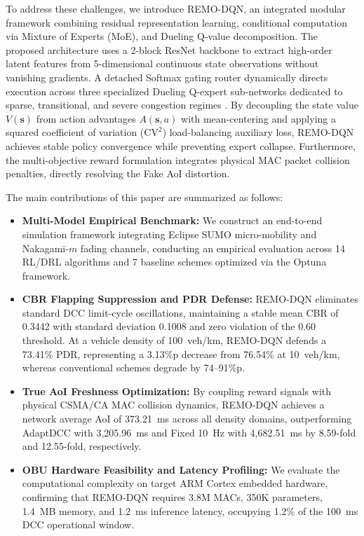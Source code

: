 \documentclass[journal]{IEEEtran}
\begin{document}
To address these challenges, we introduce REMO-DQN, an integrated modular framework combining residual representation learning, conditional computation via Mixture of Experts (MoE), and Dueling Q-value decomposition. The proposed architecture uses a 2-block ResNet backbone to extract high-order latent features from 5-dimensional continuous state observations without vanishing gradients. A detached Softmax gating router dynamically directs execution across three specialized Dueling Q-expert sub-networks dedicated to sparse, transitional, and severe congestion regimes \cite{Shazeer2017Outrageously, Xu2025Mixture}. By decoupling the state value $V(\mathbf{s})$ from action advantages $A(\mathbf{s}, a)$ with mean-centering and applying a squared coefficient of variation ($\text{CV}^2$) load-balancing auxiliary loss, REMO-DQN achieves stable policy convergence while preventing expert collapse. Furthermore, the multi-objective reward formulation integrates physical MAC packet collision penalties, directly resolving the Fake AoI distortion.

The main contributions of this paper are summarized as follows:
\begin{itemize}
    \item \textbf{Multi-Model Empirical Benchmark:} We construct an end-to-end simulation framework integrating Eclipse SUMO micro-mobility and Nakagami-$m$ fading channels, conducting an empirical evaluation across 14 RL/DRL algorithms and 7 baseline schemes optimized via the Optuna framework.
    \item \textbf{CBR Flapping Suppression and PDR Defense:} REMO-DQN eliminates standard DCC limit-cycle oscillations, maintaining a stable mean CBR of 0.3442 with standard deviation 0.1008 and zero violation of the 0.60 threshold. At a vehicle density of 100~veh/km, REMO-DQN defends a 73.41\% PDR, representing a 3.13\%p decrease from 76.54\% at 10~veh/km, whereas conventional schemes degrade by 74--91\%p.
    \item \textbf{True AoI Freshness Optimization:} By coupling reward signals with physical CSMA/CA MAC collision dynamics, REMO-DQN achieves a network average AoI of 373.21~ms across all density domains, outperforming AdaptDCC with 3,205.96~ms and Fixed 10~Hz with 4,682.51~ms by 8.59-fold and 12.55-fold, respectively.
    \item \textbf{OBU Hardware Feasibility and Latency Profiling:} We evaluate the computational complexity on target ARM Cortex embedded hardware, confirming that REMO-DQN requires 3.8M MACs, 350K parameters, 1.4~MB memory, and 1.2~ms inference latency, occupying 1.2\% of the 100~ms DCC operational window.
\end{itemize}
\end{document}
